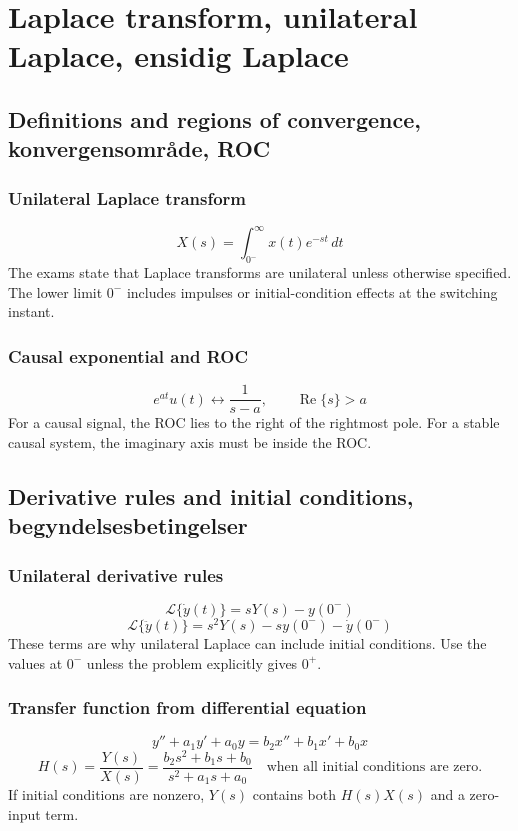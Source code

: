 \section{Laplace transform, unilateral Laplace, ensidig Laplace}

\subsection{Definitions and regions of convergence, konvergensområde, ROC}

\subsubsection{Unilateral Laplace transform}
\[
X(s)=\int_{0^-}^{\infty}x(t)e^{-st}\,dt
\]
The exams state that Laplace transforms are unilateral unless otherwise specified. The lower limit \(0^-\) includes impulses or initial-condition effects at the switching instant.

\subsubsection{Causal exponential and ROC}
\[
e^{at}u(t)\leftrightarrow \frac{1}{s-a},\qquad \operatorname{Re}\{s\}>a
\]
For a causal signal, the ROC lies to the right of the rightmost pole. For a stable causal system, the imaginary axis must be inside the ROC.

\subsection{Derivative rules and initial conditions, begyndelsesbetingelser}

\subsubsection{Unilateral derivative rules}
\[
\mathcal{L}\{\dot y(t)\}=sY(s)-y(0^-)
\]
\[
\mathcal{L}\{\ddot y(t)\}=s^2Y(s)-s y(0^-)-\dot y(0^-)
\]
These terms are why unilateral Laplace can include initial conditions. Use the values at \(0^-\) unless the problem explicitly gives \(0^+\).

\subsubsection{Transfer function from differential equation}
\[
y''+a_1y'+a_0y=b_2x''+b_1x'+b_0x
\]
\[
H(s)=\frac{Y(s)}{X(s)}=\frac{b_2s^2+b_1s+b_0}{s^2+a_1s+a_0}
\quad\text{when all initial conditions are zero.}
\]
If initial conditions are nonzero, \(Y(s)\) contains both \(H(s)X(s)\) and a zero-input term.

